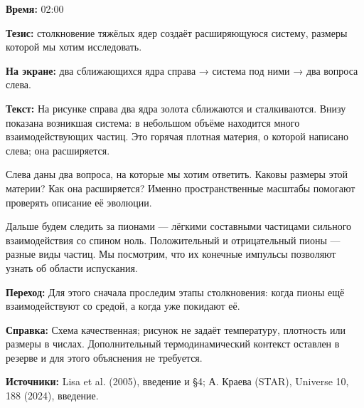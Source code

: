 \textbf{Время:} 02:00

\textbf{Тезис:} столкновение тяжёлых ядер создаёт расширяющуюся систему, размеры которой мы хотим исследовать.

\textbf{На экране:} два сближающихся ядра справа → система под ними → два вопроса слева.

\textbf{Текст:} На рисунке справа два ядра золота сближаются и сталкиваются. Внизу показана возникшая система: в небольшом объёме находится много взаимодействующих частиц. Это горячая плотная материя, о которой написано слева; она расширяется.

Слева даны два вопроса, на которые мы хотим ответить. Каковы размеры этой материи? Как она расширяется? Именно пространственные масштабы помогают проверять описание её эволюции.

Дальше будем следить за пионами — лёгкими составными частицами сильного взаимодействия со спином ноль. Положительный и отрицательный пионы — разные виды частиц. Мы посмотрим, что их конечные импульсы позволяют узнать об области испускания.

\textbf{Переход:} Для этого сначала проследим этапы столкновения: когда пионы ещё взаимодействуют со средой, а когда уже покидают её.

\textbf{Справка:} Схема качественная; рисунок не задаёт температуру, плотность или размеры в числах. Дополнительный термодинамический контекст оставлен в резерве и для этого объяснения не требуется.

\textbf{Источники:} Lisa et al. (2005), введение и §4; А. Краева (STAR), Universe 10, 188 (2024), введение.

